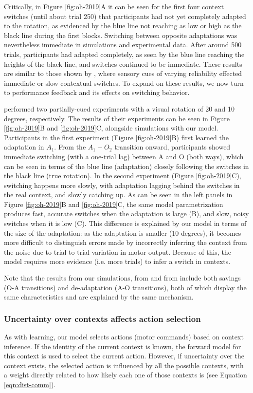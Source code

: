 \documentclass[a4paper,doc,floatsintext,natbib]{apa6}%
\def \fref #1{Figure \ref{#1}}     %
\def \eref #1{Equation \ref{#1}}   %
\begin{document}
Critically, in \fref{fig:oh-2019}A it can be seen for the first four context switches (until about trial 250) that participants had not yet completely adapted to the rotation, as evidenced by the blue line not reaching as low or high as the black line during the first blocks. Switching between opposite adaptations was nevertheless immediate in simulations and experimental data. After around 500 trials, participants had adapted completely, as seen by the blue line reaching the heights of the black line, and switches continued to be immediate. These results are similar to those shown by \cite{Imamizu_Explicit_2007}, where sensory cues of varying reliability effected immediate or slow contextual switches. To expand on these results, we now turn to performance feedback and its effects on switching behavior.

\cite{Oh_Minimizing_2019} performed two partially-cued experiments with a visual rotation of 20 and 10 degrees, respectively. The results of their experiments can be seen in \fref{fig:oh-2019}B and \ref{fig:oh-2019}C, alongside simulations with our model. Participants in the first experiment (\fref{fig:oh-2019}B) first learned the adaptation in $A_1$. From the $A_1 - O_2$ transition onward, participants showed immediate switching (with a one-trial lag) between A and O (both ways), which can be seen in terms of the blue line (adaptation) closely following the switches in the black line (true rotation). In the second experiment (\fref{fig:oh-2019}C), switching happens more slowly, with adaptation lagging behind the switches in the real context, and slowly catching up. As can be seen in the left panels in \fref{fig:oh-2019}B and \ref{fig:oh-2019}C, the same model parametrization produces fast, accurate switches when the adaptation is large (B), and slow, noisy switches when it is low (C). This difference is explained by our model in terms of the size of the adaptation: as the adaptation is smaller (10 degrees), it becomes more difficult to distinguish errors made by incorrectly inferring the context from the noise due to trial-to-trial variation in motor output. Because of this, the model requires more evidence (i.e. more trials) to infer a switch in contexts.

Note that the results from our simulations, from \cite{Oh_Minimizing_2019} and from \cite{Kim_Neural_2015} include both savings (O-A transitions) and de-adaptation (A-O transitions), both of which display the same characteristics and are explained by the same mechanism.

\subsubsection{Uncertainty over contexts affects action selection}
As with learning, our model selects actions (motor commands) based on context inference. If the identity of the current context is known, the forward model for this context is used to select the current action. However, if uncertainty over the context exists, the selected action is influenced by all the possible contexts, with a weight directly related to how likely each one of those contexts is (see \eref{eqn:dist-comm}).
\end{document}
